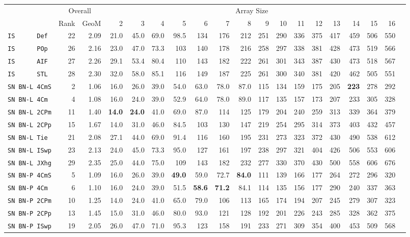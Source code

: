 \begin{tabular}{l | r @{~~} r | r@{~~}r@{~~}r@{~~}r@{~~}r@{~~}r@{~~}r@{~~}r@{~~}r@{~~}r@{~~}r@{~~}r@{~~}r@{~~}r@{~~}r@{~~}r|}
 & \multicolumn{2}{c|}{Overall} & \multicolumn{15}{c}{Array Size} \\
 & Rank & GeoM & 2&3&4&5&6&7&8&9&10&11&12&13&14&15&16\\ \hline
\verb+IS      Def+ & 22 & 2.09 & 21.0&45.0&69.0&98.5&134&176&212&251&290&336&375&417&459&506&550\\
\verb+IS      POp+ & 26 & 2.16 & 23.0&47.0&73.3&103&140&178&216&258&297&338&381&428&473&519&566\\
\verb+IS      AIF+ & 27 & 2.26 & 29.1&53.4&80.4&110&143&182&222&261&301&343&387&430&473&518&567\\
\verb+IS      STL+ & 28 & 2.30 & 32.0&58.0&85.1&116&149&187&225&261&300&340&381&420&462&505&551\smallskip \\
\verb+SN BN-L 4CmS+ & 2 & 1.06 & 16.0&26.0&39.0&54.0&63.0&78.0&87.0&115&134&159&175&205&\textbf{223}&278&292\\
\verb+SN BN-L 4Cm + & 4 & 1.08 & 16.0&24.0&39.0&52.9&64.0&78.0&89.0&117&135&157&173&207&233&305&328\\
\verb+SN BN-L 2CPm+ & 11 & 1.40 & \textbf{14.0}&\textbf{24.0}&41.0&69.0&87.0&114&125&179&204&240&259&313&339&364&379\\
\verb+SN BN-L 2CPp+ & 15 & 1.67 & 14.0&31.0&46.0&84.5&103&130&147&219&254&295&314&373&403&432&457\\
\verb+SN BN-L Tie + & 21 & 2.08 & 27.1&44.0&69.0&91.4&116&160&195&231&273&323&372&430&490&538&612\\
\verb+SN BN-L ISwp+ & 23 & 2.13 & 24.0&45.0&73.3&95.0&127&161&197&238&297&321&404&426&506&553&606\\
\verb+SN BN-L JXhg+ & 29 & 2.35 & 25.0&44.0&75.0&109&143&182&232&277&330&370&430&500&558&606&676\smallskip \\
\verb+SN BN-P 4CmS+ & 5 & 1.09 & 16.0&26.0&39.0&\textbf{49.0}&59.0&72.7&\textbf{84.0}&111&139&166&177&264&272&296&320\\
\verb+SN BN-P 4Cm + & 6 & 1.10 & 16.0&24.0&39.0&51.5&\textbf{58.6}&\textbf{71.2}&84.1&114&135&156&177&290&240&337&363\\
\verb+SN BN-P 2CPm+ & 10 & 1.25 & 14.0&24.0&41.0&65.0&79.0&106&113&165&174&194&207&245&279&307&323\\
\verb+SN BN-P 2CPp+ & 13 & 1.45 & 15.0&31.0&46.0&80.0&93.0&121&128&192&201&226&243&285&328&362&375\\
\verb+SN BN-P ISwp+ & 19 & 2.05 & 26.0&47.0&71.0&95.3&123&158&191&233&271&309&354&400&453&509&568\\

\end{tabular}
